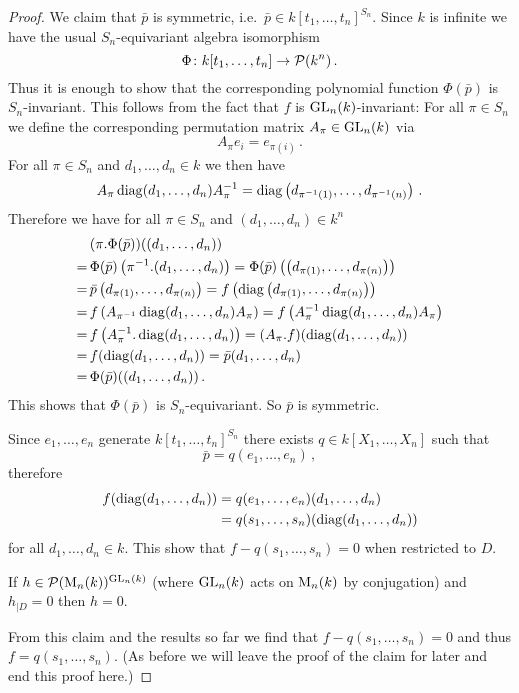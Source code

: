\begin{proof}
  We claim that $\bar{p}$ is symmetric, i.e.\ $\bar{p} \in k[t_1, \dotsc, t_n]^{S_n}$.
  Since $k$ is infinite we have the usual $S_n$-equivariant algebra isomorphism
  \[
            \Phi
    \colon  k[t_1, \dotsc, t_n]
    \to     \mathcal{P}(k^n) \,.
  \]
  Thus it is enough to show that the corresponding polynomial function $\Phi(\bar{p})$ is $S_n$-invariant.
  This follows from the fact that $f$ is $\operatorname{GL}_n(k)$-invariant:
  For all $\pi \in S_n$ we define the corresponding permutation matrix $A_\pi \in \operatorname{GL}_n(k)$ via
  \[
      A_\pi e_i
    = e_{\pi(i)} \,.
  \]
  For all $\pi \in S_n$ and $d_1, \dotsc, d_n \in k$ we then have
  \[
      A_\pi \operatorname{diag}(d_1, \dotsc, d_n) A_\pi^{-1}
    = \operatorname{diag}\left( d_{\pi^{-1}(1)}, \dotsc, d_{\pi^{-1}(n)} \right) \,.
  \]
  Therefore we have for all $\pi \in S_n$ and $(d_1, \dotsc, d_n) \in k^n$
  \begin{align*}
     &\,  (\pi.\Phi(\bar{p}))((d_1, \dotsc, d_n)) \\
    =&\,  \Phi(\bar{p})\left( \pi^{-1}.(d_1, \dotsc, d_n) \right)
     =    \Phi(\bar{p})\left( \left(d_{\pi(1)}, \dotsc, d_{\pi(n)}\right) \right) \\
    =&\,  \bar{p}\left( d_{\pi(1)}, \dotsc, d_{\pi(n)} \right)
     =    f\left( \operatorname{diag}\left( d_{\pi(1)}, \dotsc, d_{\pi(n)} \right) \right) \\
    =&\,  f\left( A_{\pi^{-1}} \operatorname{diag}(d_1, \dotsc, d_n) A_\pi \right)
     =    f\left( A_\pi^{-1} \operatorname{diag}(d_1, \dotsc, d_n) A_\pi \right) \\
    =&\,  f\left( A_\pi^{-1}.\operatorname{diag}(d_1, \dotsc, d_n) \right)
     =    (A_\pi.f)(\operatorname{diag}(d_1, \dotsc, d_n)) \\
    =&\,  f(\operatorname{diag}(d_1, \dotsc, d_n))
     =    \bar{p}(d_1, \dotsc, d_n) \\
    =&\,  \Phi(\bar{p})((d_1, \dotsc, d_n)) \,.
  \end{align*}
  This shows that $\Phi(\bar{p})$ is $S_n$-equivariant.
  So $\bar{p}$ is symmetric.
  
  Since $e_1, \dotsc, e_n$ generate $k[t_1, \dotsc, t_n]^{S_n}$ there exists $q \in k[X_1, \dotsc, X_n]$ such that
  \[
      \bar{p}
    = q(e_1, \dotsc, e_n) \,,
  \]
  therefore
  \begin{align*}
        f(\operatorname{diag}(d_1, \dotsc, d_n))
    &=  q(e_1, \dotsc, e_n)(d_1, \dotsc, d_n) \\
    &=  q(s_1, \dotsc, s_n)(\operatorname{diag}(d_1, \dotsc, d_n))
  \end{align*}
  for all $d_1, \dotsc, d_n \in k$.
  This show that $f-q(s_1, \dotsc, s_n) = 0$ when restricted to $D$.
  
  \begin{claim}
    If $h \in \mathcal{P}(\operatorname{M}_n(k))^{\operatorname{GL}_n(k)}$ (where $\operatorname{GL}_n(k)$ acts on $\operatorname{M}_n(k)$ by conjugation) and $h_{|D} = 0$ then $h = 0$.
  \end{claim}

  From this claim and the results so far we find that $f - q(s_1, \dotsc, s_n) = 0$ and thus $f = q(s_1, \dotsc, s_n)$.
  (As before we will leave the proof of the claim for later and end this proof here.)
\end{proof}



